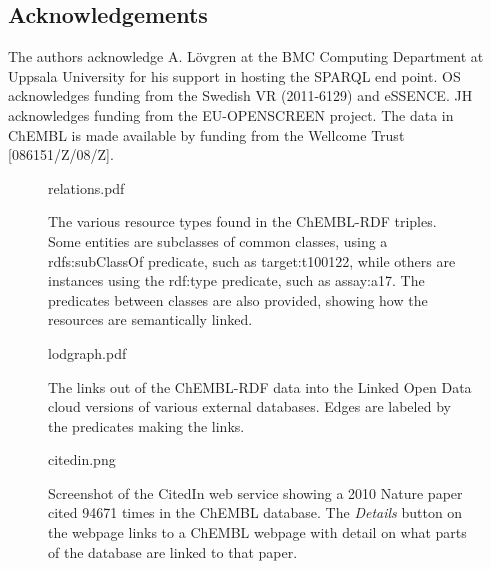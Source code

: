 \documentclass[10pt]{bmc_article}
\newenvironment{bmcformat}{\begin{raggedright}\baselineskip20pt\sloppy\setboolean{publ}{false}}{\end{raggedright}\baselineskip20pt\sloppy}
\begin{document}
\begin{bmcformat}
\section*{Acknowledgements}

The authors acknowledge A. L\"ovgren at the BMC Computing Department at Uppsala University for his
support in hosting the SPARQL end point. OS acknowledges funding from the Swedish VR (2011-6129) and eSSENCE. 
JH acknowledges funding from the EU-OPENSCREEN project. 
The data in ChEMBL is made available by funding from the Wellcome Trust [086151/Z/08/Z].

{
  
}


\newpage

\begin{figure}[t]
\begin{center}
relations.pdf
\caption{The various resource types found in the ChEMBL-RDF triples. Some entities are
subclasses of common classes, using a rdfs:subClassOf predicate, such as
target:t100122, while others are instances using the rdf:type predicate, such as
assay:a17. The predicates between classes are also provided, showing how the
resources are semantically linked.}\label{f1}
\end{center}
\end{figure}

\begin{figure}[t]
{\center
lodgraph.pdf
\caption{The links out of the ChEMBL-RDF data into the Linked Open Data cloud
versions of various external databases. Edges are labeled by the predicates making
the links.}\label{2}
}
\end{figure}

\begin{figure*}[!ht]
		\begin{center}
		citedin.png
		\caption[wee]{Screenshot of the CitedIn web service showing a 2010
		Nature paper cited 94671 times in the ChEMBL database.
		   The \textit{Details} button on the webpage links to a ChEMBL webpage with detail on what parts of the database are
		   linked to that paper.}
	\label{fig:citedin}
		\end{center}
\end{figure*}


\end{bmcformat}
\end{document}
